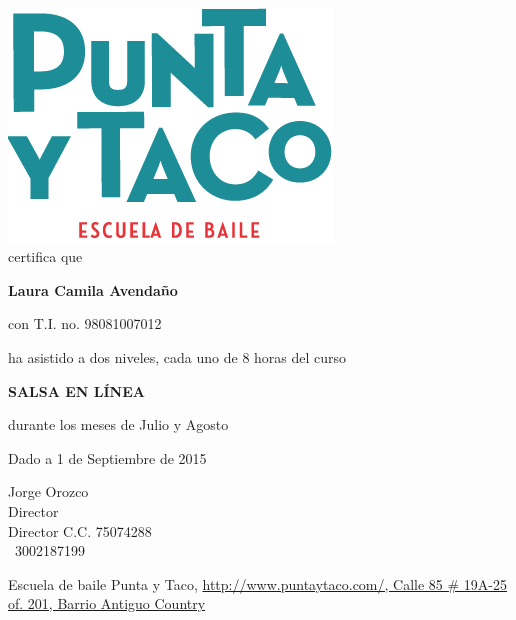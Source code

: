 \documentclass[12pt]{article}
\begin{document}
~
\vspace{.75cm}
\begin{center}

\huge{\includegraphics[scale=.75]{Images/Pantallazo-14.png} \\ certifica que}

\vspace{.75cm}

\Huge{\textbf{Laura Camila Avendaño}}

\vspace{.75cm}

\Large{con T.I. no. 98081007012

ha asistido a dos niveles, cada uno de 8 horas del curso}

\vspace{.75cm}

\Huge{\textbf{ SALSA EN LÍNEA}}

\vspace{.75cm}

\Large{durante los meses de Julio y Agosto}

\vspace{.45cm}

\Large{Dado a 1 de Septiembre de 2015}

\vspace{.45cm}

\large Jorge Orozco\\ \normalsize Director\\ \footnotesize Director C.C. 75074288\\\Mobilefone ~3002187199 
\vspace*{20pt}

\tiny Escuela de baile Punta y Taco, \url{http://www.puntaytaco.com/, Calle 85 \# 19A-25 of. 201, Barrio Antiguo Country}

\end{center}
\end{document}

